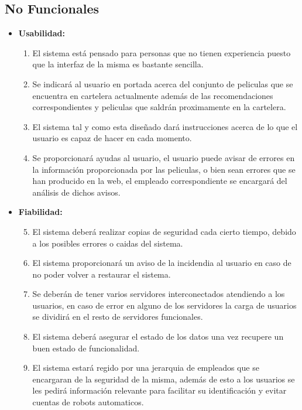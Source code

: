 \documentclass{article}
\begin{document}
	    
    \subsection{No Funcionales}
    \begin{itemize}
    \item \textbf{Usabilidad:}
        \begin{enumerate}[label=\bfseries RN- \arabic*:]
        \item El sistema está pensado para personas que no tienen experiencia puesto que la interfaz de la misma es bastante sencilla.
        \item Se indicará al usuario en portada acerca del conjunto de peliculas que se encuentra en cartelera actualmente además de las recomendaciones correspondientes y peliculas que saldrán proximamente en la cartelera.
        \item El sistema tal y como esta diseñado dará instrucciones acerca de lo que el usuario es capaz de hacer en cada momento.
        \item Se proporcionará ayudas al usuario, el usuario puede avisar de errores en la información proporcionada por las peliculas, o bien sean errores que se han producido en la web, el empleado correspondiente se encargará del análisis de dichos avisos. 
        \end{enumerate}
        
    \item \textbf{Fiabilidad:}
        \begin{enumerate}[label=\bfseries RN- \arabic*:]
        \setcounter{enumi}{4}
        \item El sistema deberá realizar copias de seguridad cada cierto tiempo, debido a los posibles errores o caidas del sistema.
        \item El sistema proporcionará un aviso de la incidendia al usuario en caso de no poder volver a restaurar el sistema.
        \item Se deberán de tener varios servidores interconectados atendiendo a los usuarios, en caso de error en alguno de los servidores la carga de usuarios se dividirá en el resto de servidores funcionales.
        \item El sistema deberá asegurar el estado de los datos una vez recupere un buen estado de funcionalidad.
        \item El sistema estará regido por una jerarquia de empleados que se encargaran de la seguridad de la misma, además de esto a los usuarios se les pedirá información relevante para facilitar su identificación y evitar cuentas de robots automaticos. 
        \end{enumerate}
        

\end{itemize}
\end{document}
